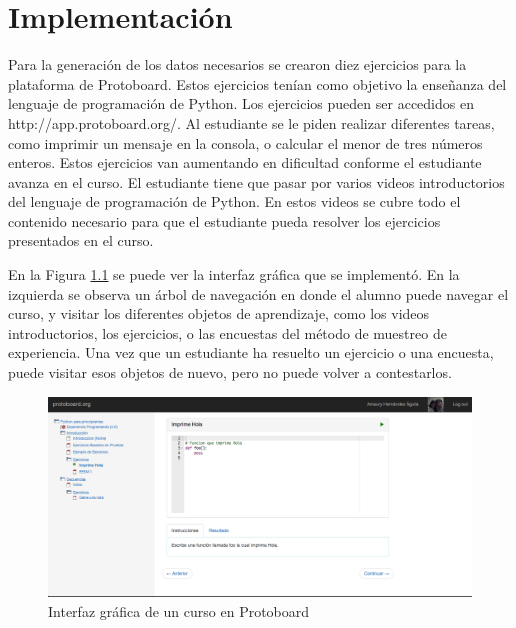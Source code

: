 

\chapter{Implementación}
\label{implementacion}

Para la generación de los datos necesarios se crearon diez ejercicios
para la plataforma de Protoboard. Estos ejercicios tenían como
objetivo la enseñanza del lenguaje de programación de Python. Los
ejercicios pueden ser accedidos en http://app.protoboard.org/. Al
estudiante se le piden realizar diferentes tareas, como imprimir un
mensaje en la consola, o calcular el menor de tres números
enteros. Estos ejercicios van aumentando en dificultad conforme el
estudiante avanza en el curso. El estudiante tiene que pasar por
varios videos introductorios del lenguaje de programación de
Python. En estos videos se cubre todo el contenido necesario para que
el estudiante pueda resolver los ejercicios presentados en el curso.

En la Figura \ref{FigProtoboard} se puede ver la interfaz gráfica que
se implementó. En la izquierda se observa un árbol de navegación en
donde el alumno puede navegar el curso, y visitar los diferentes
objetos de aprendizaje, como los videos introductorios, los
ejercicios, o las encuestas del método de muestreo de experiencia. Una
vez que un estudiante ha resuelto un ejercicio o una encuesta, puede
visitar esos objetos de nuevo, pero no puede volver a contestarlos.

\begin{figure}[htp]
  \centerline{\includegraphics[width=16.09cm]{protoboard.png}} \caption{Interfaz gráfica
    de un curso en Protoboard
} \label{FigProtoboard}
\end{figure}

